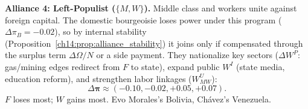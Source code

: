\documentclass[../structural_economics_book.tex]{subfiles}
\begin{document}
\begin{example}
\textbf{Alliance 4: Left-Populist ($\{M, W\}$).} Middle class and workers unite against foreign capital. The domestic bourgeoisie loses power under this program ($\Delta\pi_B = -0.02$), so by internal stability (Proposition~\ref{ch14:prop:alliance_stability}) it joins only if compensated through the surplus term $\Delta\Omega/N$ or a side payment. They nationalize key sectors ($\Delta W^P$: gas/mining edges redirect from $F$ to state), expand public $W^I$ (state media, education reform), and strengthen labor linkages ($W^U_{MW}$):
\begin{equation}
\Delta\boldsymbol{\pi} \approx (-0.10, -0.02, +0.05, +0.07).
\end{equation}
$F$ loses most; $W$ gains most. Evo Morales's Bolivia, Ch\'{a}vez's Venezuela.
\end{example}
\end{document}
